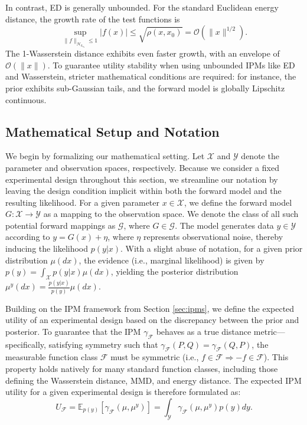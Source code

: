 \documentclass[twoside,11pt]{article}
\def\gO{{\mathcal{O}}}
\begin{document}
In contrast, ED is generally unbounded. For the standard Euclidean energy distance, the growth rate of the test functions is $$\sup_{\|f\|_{\mathcal{H}_{k_{x_0}}}\leq 1}|f(x)|\leq\sqrt{\rho(x,x_0)}=\gO(\|x\|^{1/2}).$$
The 1-Wasserstein distance exhibits even faster growth, with an envelope of $\mathcal{O}(\lVert x \rVert)$. To guarantee utility stability when using unbounded IPMs like ED and Wasserstein, stricter mathematical conditions are required: for instance, the prior exhibits sub-Gaussian tails, and the forward model is globally Lipschitz continuous.

\subsection{Mathematical Setup and Notation} 
We begin by formalizing our mathematical setting. Let $\mathcal{X}$ and $\mathcal{Y}$ denote the parameter and observation spaces, respectively. Because we consider a fixed experimental design throughout this section, we streamline our notation by leaving the design condition implicit within both the forward model and the resulting likelihood. For a given parameter $x \in \mathcal{X}$, we define the forward model $G: \mathcal{X} \to \mathcal{Y}$ as a mapping to the observation space. We denote the class of all such potential forward mappings as $\mathcal{G}$, where $G \in \mathcal{G}$. The model generates data $y \in \mathcal{Y}$ according to $y = G(x) + \eta$, where $\eta$ represents observational noise, thereby inducing the likelihood $p(y|x)$. With a slight abuse of notation, for a given prior distribution $\mu(dx)$, the evidence (i.e., marginal likelihood) is given by $p(y) = \int_{\mathcal{X}} p(y|x)\mu(dx)$, yielding the posterior distribution $\mu^y(dx) = \frac{p(y|x)}{p(y)}\mu(dx)$.

Building on the IPM framework from Section \ref{sec:ipms}, we define the expected utility of an experimental design based on the discrepancy between the prior and posterior. To guarantee that the IPM $\gamma_{\mathcal{F}}$ behaves as a true distance metric—specifically, satisfying symmetry such that $\gamma_{\mathcal{F}}(P, Q) = \gamma_{\mathcal{F}}(Q, P)$, the measurable function class $\mathcal{F}$ must be symmetric (i.e., $f \in \mathcal{F} \Rightarrow -f \in \mathcal{F}$). This property holds natively for many standard function classes, including those defining the Wasserstein distance, MMD, and energy distance. The expected IPM utility for a given experimental design is therefore formulated as:
$$U_{\mathcal{F}} = \mathbb{E}_{p(y)} \left[ \gamma_{\mathcal{F}}(\mu, \mu^y) \right] = \int_{\mathcal{Y}} \gamma_{\mathcal{F}}(\mu, \mu^y)p(y)dy.$$
\end{document}
